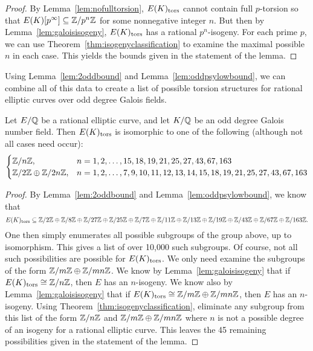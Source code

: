 \begin{proof}
By Lemma~\ref{lem:nofulltorsion}, $E(K)_{\text{tors}}$ cannot contain full $p$-torsion so that $E(K)[p^\infty] \subseteq \mathbb{Z}/p^n\mathbb{Z}$ for some nonnegative integer $n$. But then by Lemma~\ref{lem:galoisisogeny}, $E(K)_{\text{tors}}$ has a rational $p^n$-isogeny. For each prime $p$, we can use Theorem~\ref{thm:isogenyclassification} to examine the maximal possible $n$ in each case. This yields the bounds given in the statement of the lemma. 
\end{proof}


Using Lemma~\ref{lem:2oddbound} and Lemma~\ref{lem:oddpsylowbound}, we can combine all of this data to create a list of possible torsion structures for rational elliptic curves over odd degree Galois fields. 


\begin{lem} \label{lem:oddpossible}
Let $E/\mathbb{Q}$ be a rational elliptic curve, and let $K/\mathbb{Q}$ be an odd degree Galois number field. Then $E(K)_{\text{tors}}$ is isomorphic to one of the following (although not all cases need occur):
	\[
	\begin{cases}
	\mathbb{Z}/n\mathbb{Z}, & n= 1, 2, \ldots, 15, 18, 19, 21, 25, 27, 43, 67, 163 \\
	\mathbb{Z}/2\mathbb{Z} \oplus \mathbb{Z}/2n\mathbb{Z}, & n= 1, 2, \ldots, 7, 9, 10, 11, 12, 13, 14, 15, 18, 19, 21, 25, 27, 43, 67, 163
	\end{cases}
	\]
\end{lem}

\begin{proof}
By Lemma~\ref{lem:2oddbound} and Lemma~\ref{lem:oddpsylowbound}, we know that
	\[
	E(K)_{\text{tors}} \subseteq \mathbb{Z}/2\mathbb{Z} \oplus \mathbb{Z}/8\mathbb{Z} \oplus \mathbb{Z}/27\mathbb{Z} \oplus \mathbb{Z}/25\mathbb{Z} \oplus \mathbb{Z}/7\mathbb{Z} \oplus \mathbb{Z}/11\mathbb{Z} \oplus \mathbb{Z}/13\mathbb{Z} \oplus \mathbb{Z}/19\mathbb{Z} \oplus \mathbb{Z}/43\mathbb{Z} \oplus \mathbb{Z}/67\mathbb{Z} \oplus \mathbb{Z}/163\mathbb{Z}.
	\]
One then simply enumerates all possible subgroups of the group above, up to isomorphism. This gives a list of over 10,000 such subgroups. Of course, not all such possibilities are possible for $E(K)_{\text{tors}}$. We only need examine the subgroups of the form $\mathbb{Z}/m\mathbb{Z} \oplus \mathbb{Z}/mn\mathbb{Z}$. We know by Lemma~\ref{lem:galoisisogeny} that if $E(K)_{\text{tors}} \cong \mathbb{Z}/n\mathbb{Z}$, then $E$ has an $n$-isogeny. We know also by Lemma~\ref{lem:galoisisogeny} that if $E(K)_{\text{tors}} \cong \mathbb{Z}/m\mathbb{Z} \oplus \mathbb{Z}/mn\mathbb{Z}$, then $E$ has an $n$-isogeny. Using Theorem~\ref{thm:isogenyclassification}, eliminate any subgroup from this list of the form $\mathbb{Z}/n\mathbb{Z}$ and $ \mathbb{Z}/m\mathbb{Z} \oplus \mathbb{Z}/mn\mathbb{Z}$ where $n$ is not a possible degree of an isogeny for a rational elliptic curve. This leaves the 45 remaining possibilities given in the statement of the lemma. 
\end{proof}





